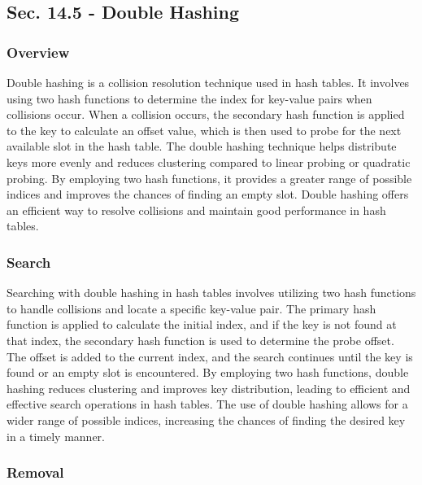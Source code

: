 \subsection*{Sec. 14.5 - Double Hashing}

\subsubsection{Overview}

Double hashing is a collision resolution technique used in hash tables. It involves using two hash functions to determine the index for key-value pairs when collisions occur. When a collision occurs, 
the secondary hash function is applied to the key to calculate an offset value, which is then used to probe for the next available slot in the hash table. The double hashing technique helps distribute 
keys more evenly and reduces clustering compared to linear probing or quadratic probing. By employing two hash functions, it provides a greater range of possible indices and improves the chances of 
finding an empty slot. Double hashing offers an efficient way to resolve collisions and maintain good performance in hash tables.

\subsubsection{Search}

Searching with double hashing in hash tables involves utilizing two hash functions to handle collisions and locate a specific key-value pair. The primary hash function is applied to calculate the initial 
index, and if the key is not found at that index, the secondary hash function is used to determine the probe offset. The offset is added to the current index, and the search continues until the key is 
found or an empty slot is encountered. By employing two hash functions, double hashing reduces clustering and improves key distribution, leading to efficient and effective search operations in hash tables. 
The use of double hashing allows for a wider range of possible indices, increasing the chances of finding the desired key in a timely manner.

\subsubsection{Removal}


